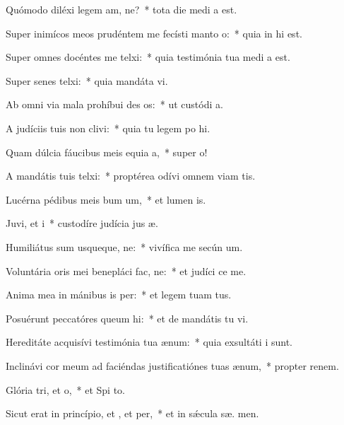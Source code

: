 \item Quómodo diléxi legem am, ne?~* tota die medi a est.
\item Super inimícos meos prudéntem me fecísti manto o:~* quia in  hi est.
\item Super omnes docéntes me telxi:~* quia testimónia tua medi a est.
\item Super senes telxi:~* quia mandáta  vi.
\item Ab omni via mala prohíbui des os:~* ut custódi  a.
\item A judíciis tuis non clivi:~* quia tu legem po hi.
\item Quam dúlcia fáucibus meis equia a,~* super   o!
\item A mandátis tuis telxi:~* proptérea odívi omnem viam tis.
\item Lucérna pédibus meis bum um,~* et lumen  is.
\item Juvi, et i~* custodíre judícia jus æ.
\item Humiliátus sum usqueque, ne:~* vivífica me secún  um.
\item Voluntária oris mei benepláci fac, ne:~* et judíci  ce me.
\item Anima mea in mánibus is per:~* et legem tuam   tus.
\item Posuérunt peccatóres queum hi:~* et de mandátis tu  vi.
\item Hereditáte acquisívi testimónia tua  ænum:~* quia exsultáti  i sunt.
\item Inclinávi cor meum ad faciéndas justificatiónes tuas  ænum,~* propter renem.
\item Glória tri, et o,~* et Spi to.
\item Sicut erat in princípio, et , et per,~* et in sǽcula sæ. men.
